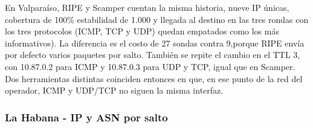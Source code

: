 En Valparaíso, RIPE y Scamper cuentan la misma historia, nueve IP únicas, cobertura de 100\% estabilidad de 1.000 y llegada al destino en las tres rondas con los tres protocolos (ICMP, TCP y UDP) quedan empatados como los más informativos). La diferencia es el costo de 27 sondas contra 9,porque RIPE envía por defecto varios paquetes por salto. También se repite el cambio en el TTL 3, con 10.87.0.2 para ICMP y 10.87.0.3 para UDP y TCP, igual que en Scamper. Dos herramientas distintas coinciden entonces en que, en ese punto de la red del operador, ICMP y UDP/TCP no siguen la misma interfaz.


\subsubsection{La Habana - IP y ASN por salto}
\begingroup
\fontsize{9}{11}\selectfont

